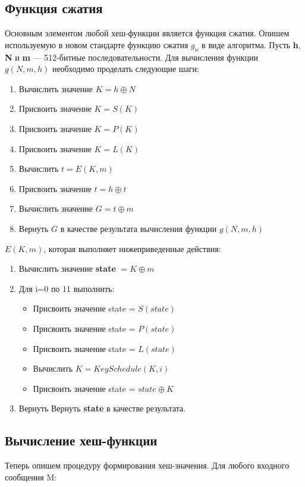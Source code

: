 \documentclass[a4paper,14pt]{report}
\begin{document}
\subsection{Функция сжатия}
Основным элементом любой хеш-функции является функция сжатия. Опишем используемую в новом стандарте функцию сжатия $g_n$ в виде алгоритма.
Пусть \textbf{h}, \textbf{N} и \textbf{m} — 512-битные последовательности. Для вычисления функции $g(N, m, h)$ необходимо проделать следующие шаги:

\begin{enumerate}
  \item Вычислить значение $K = h \oplus N$
  \item Присвоить значение $K = S(K)$
  \item Присвоить значение $K = P(K)$
  \item Присвоить значение $K = L(K)$
  \item Вычислить $t = E(K, m)$
  \item Присвоить значение $t = h \oplus t$
  \item Вычислить значение $G = t \oplus m$
  \item Вернуть $G$ в качестве результата вычисления функции $g(N, m, h)$
 \end{enumerate}
 
 $E(K, m)$, которая выполняет нижеприведенные действия:
  
  \begin{enumerate}
  \item Вычислить значение \textbf{state} $= K \oplus m$
  \item Для i=0 по 11 выполнить: 
	\begin{itemize}
	\item Присвоить значение state = $S(state)$
	\item Присвоить значение state = $P(state)$
	\item Присвоить значение state = $L(state)$
	\item Вычислить $K = KeySchedule(K, i)$
	\item Присвоить значение state = $state \oplus K$
	\end{itemize}

  \item Вернуть Вернуть \textbf{state} в качестве результата.
 \end{enumerate}

\subsection{Вычисление хеш-функции}
Теперь опишем процедуру формирования хеш-значения. Для любого входного сообщения M:
\end{document}
